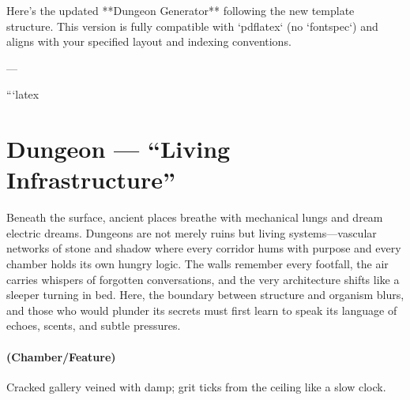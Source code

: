 Here's the updated **Dungeon Generator** following the new template structure. This version is fully compatible with `pdflatex` (no `fontspec`) and aligns with your specified layout and indexing conventions.

---

```latex
\section{Dungeon --- ``Living Infrastructure''}
\label{chap:dungeon-generator}

\begin{tcolorbox}[colback=black!3,colframe=black!40!white,title={Theme \& Atmosphere}]
Beneath the surface, ancient places breathe with mechanical lungs and dream electric dreams. Dungeons are not merely ruins but living systems—vascular networks of stone and shadow where every corridor hums with purpose and every chamber holds its own hungry logic. The walls remember every footfall, the air carries whispers of forgotten conversations, and the very architecture shifts like a sleeper turning in bed. Here, the boundary between structure and organism blurs, and those who would plunder its secrets must first learn to speak its language of echoes, scents, and subtle pressures.
\end{tcolorbox}

\paragraph*{(Chamber/Feature)} Cracked gallery veined with damp; grit ticks from the ceiling like a slow clock.


